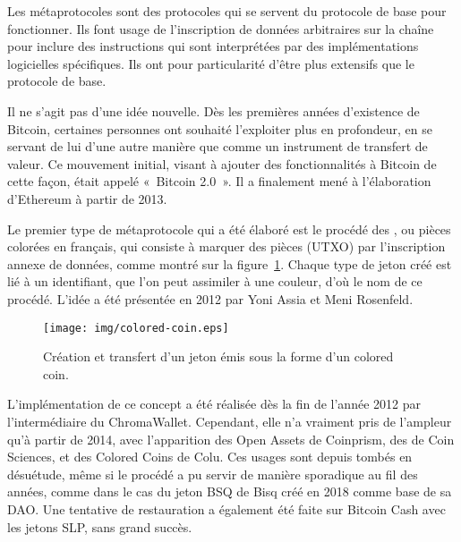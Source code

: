 Les métaprotocoles sont des protocoles qui se servent du protocole de base pour fonctionner. Ils font usage de l'inscription de données arbitraires sur la chaîne pour inclure des instructions qui sont interprétées par des implémentations logicielles spécifiques. Ils ont pour particularité d'être plus extensifs que le protocole de base.

Il ne s'agit pas d'une idée nouvelle. Dès les premières années d'existence de Bitcoin, certaines personnes ont souhaité l'exploiter plus en profondeur, en se servant de lui d'une autre manière que comme un instrument de transfert de valeur. Ce mouvement initial, visant à ajouter des fonctionnalités à Bitcoin de cette façon, était appelé «~Bitcoin 2.0~». Il a finalement mené à l'élaboration d'Ethereum à partir de 2013.

Le premier type de métaprotocole qui a été élaboré est le procédé des , ou pièces colorées en français, qui consiste à marquer des pièces (UTXO) par l'inscription annexe de données, comme montré sur la figure~\ref{fig:colored-coin}. Chaque type de jeton créé est lié à un identifiant, que l'on peut assimiler à une couleur, d'où le nom de ce procédé. L'idée a été présentée en 2012 par Yoni Assia et Meni Rosenfeld. %

\begin{figure}[h]
  \centering
  \texttt{[image: img/colored-coin.eps]}
  \caption{Création et transfert d'un jeton émis sous la forme d'un colored coin.}
  \label{fig:colored-coin}
\end{figure}

L'implémentation de ce concept a été réalisée dès la fin de l'année 2012 par l'intermédiaire du ChromaWallet. Cependant, elle n'a vraiment pris de l'ampleur qu'à partir de 2014, avec l'apparition des Open Assets de Coinprism, des  de Coin Sciences, et des Colored Coins de Colu. Ces usages sont depuis tombés en désuétude, même si le procédé a pu servir de manière sporadique au fil des années, comme dans le cas du jeton BSQ de Bisq créé en 2018 comme base de sa DAO. Une tentative de restauration a également été faite sur Bitcoin Cash avec les jetons SLP, sans grand succès. %

